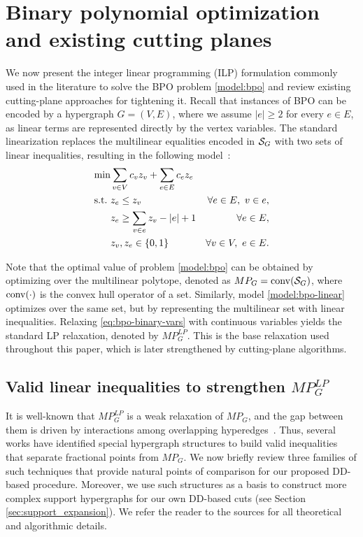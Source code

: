 \section{Binary polynomial optimization and existing cutting planes}
\label{sec:bpo_and_structures}


We now present the integer linear programming (ILP) formulation commonly used in the literature to solve the BPO problem \eqref{model:bpo} and review existing cutting-plane approaches for tightening it. Recall that instances of BPO can be encoded by a hypergraph $G=(V, E)$, where we assume  $|e|\ge 2$ for every $e\in E$, as linear terms are represented directly by the vertex variables. The standard linearization replaces the multilinear equalities encoded in $\mathcal{S}_G$ with two sets of linear inequalities, resulting in the following model~\cite{fortet1960algebre,gloverWoolsey1974converting}:
%
\begin{subequations}\label{model:bpo-linear}
	\begin{align}
		\min & \sum_{v\in V} c_v z_v + \sum_{e\in E} c_e z_e \label{eq:bpo-objective} \\
		\text{s.t.}\  & z_e \le z_v & \forall e\in E,\ v\in e,\\
		& z_e \ge \sum_{v\in e} z_v - |e| + 1 &\forall e\in E, \\
		& z_v, z_e \in \{0,1\} &\forall v\in V,\ e\in E. \label{eq:bpo-binary-vars}
	\end{align}
\end{subequations}

Note that the optimal value of problem \eqref{model:bpo} can be obtained by optimizing over the multilinear polytope, denoted as $ MP_G=\operatorname{conv}(\mathcal{S}_G)$, where $\operatorname{conv}(\cdot)$ is the convex hull operator of a set. Similarly, model \eqref{model:bpo-linear} optimizes over the same set, but by representing the multilinear set with linear inequalities. Relaxing \eqref{eq:bpo-binary-vars} with continuous variables yields the standard  LP relaxation, denoted by
$MP_G^{LP}$. This is the base relaxation used throughout this paper, which is later strengthened by cutting-plane algorithms.

\subsection{Valid linear inequalities to strengthen $MP_G^{LP}$}
\label{subsec:literature_inequalities}

It is well-known that $MP_G^{LP}$ is a weak relaxation of $MP_G$, and the gap between them is driven by interactions among overlapping hyperedges~\cite{cramaRodriguezHeck2017valid,del2017polyhedral}. Thus, several works have identified special hypergraph structures to build valid inequalities that separate fractional points from $MP_G$. We now briefly review three families of such techniques that provide natural points of comparison for our proposed DD-based procedure. Moreover, we use such structures as a basis to construct more complex support hypergraphs for our own DD-based cuts (see Section \ref{sec:support_expansion}). We refer the reader to the sources for all theoretical and algorithmic details. 

